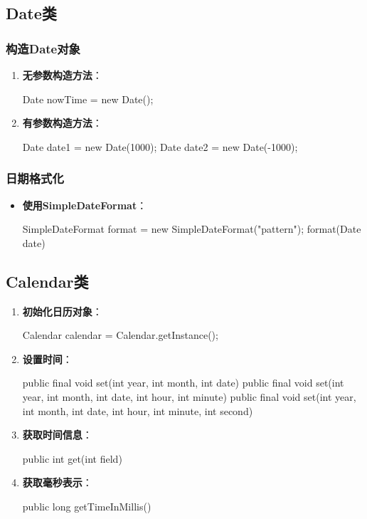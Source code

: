 \documentclass[a4paper, 10pt]{ctexart}
\begin{document}
\subsection{Date类}
\subsubsection{构造Date对象}
\begin{enumerate}
  \item \textbf{无参数构造方法}：
  \begin{codeblock}
Date nowTime = new Date();
  \end{codeblock}
  \item \textbf{有参数构造方法}：
  \begin{codeblock}
Date date1 = new Date(1000);
Date date2 = new Date(-1000);
  \end{codeblock}
\end{enumerate}

\subsubsection{日期格式化}
\begin{itemize}
  \item \textbf{使用SimpleDateFormat}：
  \begin{codeblock}
SimpleDateFormat format = new SimpleDateFormat("pattern");
format(Date date)
  \end{codeblock}
\end{itemize}

\subsection{Calendar类}
\begin{enumerate}
  \item \textbf{初始化日历对象}：
  \begin{codeblock}
Calendar calendar = Calendar.getInstance();
  \end{codeblock}
  \item \textbf{设置时间}：
  \begin{codeblock}
public final void set(int year, int month, int date)
public final void set(int year, int month, int date, int hour, int minute)
public final void set(int year, int month, int date, int hour, int minute, int second)
  \end{codeblock}
  \item \textbf{获取时间信息}：
  \begin{codeblock}
public int get(int field)
  \end{codeblock}
  \item \textbf{获取毫秒表示}：
  \begin{codeblock}
public long getTimeInMillis()
  \end{codeblock}
\end{enumerate}
\end{document}
